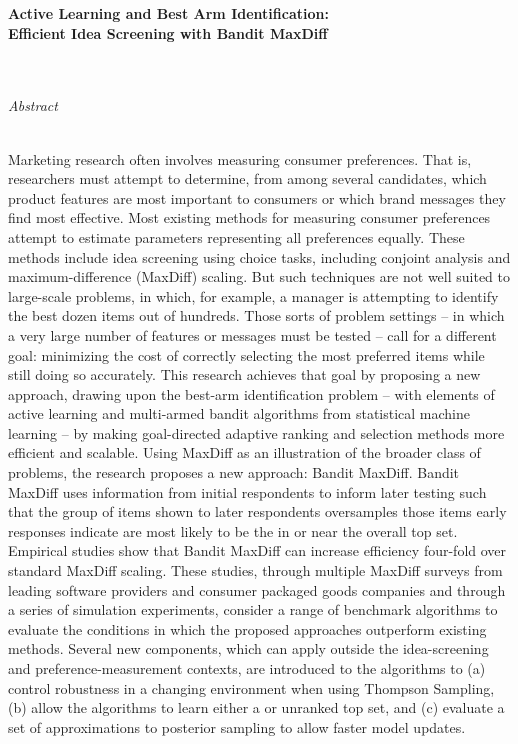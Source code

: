 \documentclass[nonblindrev]{informs3}
\newcommand{\titleofthispaper}{
	\textbf{Active Learning and Best Arm Identification: \\
	Efficient Idea Screening with Bandit MaxDiff} 
}
\begin{document}
\KEYWORDS{%
}





\begin{center}
	\titleofthispaper
	~ \\ ~ \\
	\emph{Abstract}
	~ \\ ~ \\
\end{center}

\SingleSpacedXI
Marketing research often involves measuring consumer preferences.  That is, researchers must attempt to determine, from among several candidates, which product features are most important to consumers or which brand messages they find most effective.  Most existing methods for measuring consumer preferences attempt to estimate parameters representing all preferences equally.  These methods include idea screening using choice tasks, including conjoint analysis and maximum-difference (MaxDiff) scaling.  But such techniques are not well suited to large-scale problems, in which, for example, a manager is attempting to identify the best dozen items out of hundreds. Those sorts of problem settings -- in which a very large number of features or messages must be tested -- call for a different goal: minimizing the cost of correctly selecting the most preferred items while still doing so accurately. This research achieves that goal by proposing a new approach, drawing upon the best-arm identification problem -- with elements of active learning and multi-armed bandit algorithms from statistical machine learning -- by making goal-directed adaptive ranking and selection methods more efficient and scalable. Using MaxDiff as an illustration of the broader class of problems, the research proposes a new approach: Bandit MaxDiff.  Bandit MaxDiff uses information from initial respondents to inform later testing such that the group of items shown to later respondents oversamples those items early responses indicate are most likely to be the in or near the overall top set. Empirical studies show that Bandit MaxDiff can increase efficiency four-fold over standard MaxDiff scaling. These studies, through multiple MaxDiff surveys from leading software providers and consumer packaged goods companies and through a series of simulation experiments, consider a range of benchmark algorithms to evaluate the conditions in which the proposed approaches outperform existing methods. Several new components, which can apply outside the idea-screening and preference-measurement contexts, are introduced to the algorithms to (a) control robustness in a changing environment when using Thompson Sampling, (b) allow the algorithms to learn either a or unranked top set, and (c) evaluate a set of approximations to posterior sampling to allow faster model updates.
\end{document}
